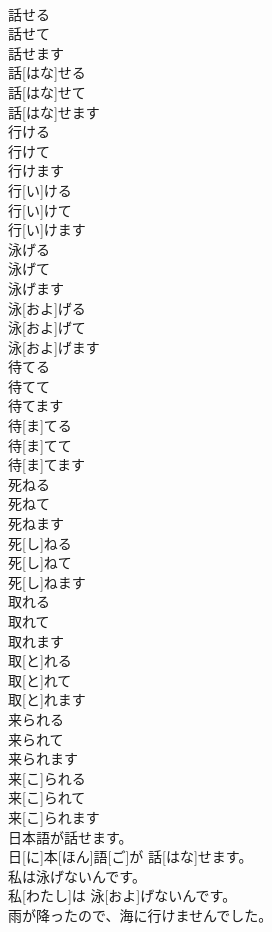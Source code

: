 \documentclass[8pt]{extreport}
\begin{document}
\begin{CJK}{UTF8}{min}
\\	話せる 
\\	話せて 
\\	話せます	
\\	話[はな]せる 
\\	話[はな]せて 
\\	話[はな]せます
\\	行ける 
\\	行けて 
\\	行けます	
\\	行[い]ける 
\\	行[い]けて 
\\	行[い]けます
\\	泳げる 
\\	泳げて 
\\	泳げます	
\\	泳[およ]げる 
\\	泳[およ]げて 
\\	泳[およ]げます
\\	待てる 
\\	待てて 
\\	待てます	
\\	待[ま]てる 
\\	待[ま]てて 
\\	待[ま]てます
\\	死ねる 
\\	死ねて 
\\	死ねます	
\\	死[し]ねる 
\\	死[し]ねて 
\\	死[し]ねます
\\	取れる 
\\	取れて 
\\	取れます	
\\	取[と]れる 
\\	取[と]れて 
\\	取[と]れます
\\	来られる 
\\	来られて 
\\	来られます	
\\	来[こ]られる 
\\	来[こ]られて 
\\	来[こ]られます
\\	日本語が話せます。	
\\	日[に]本[ほん]語[ご]が 話[はな]せます。
\\	私は泳げないんです。	
\\	私[わたし]は 泳[およ]げないんです。
\\	雨が降ったので、海に行けませんでした。	

\end{CJK}
\end{document}
